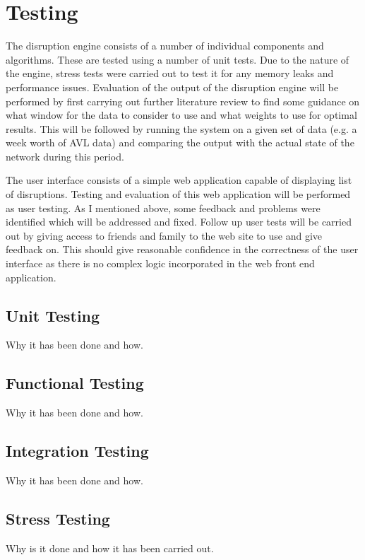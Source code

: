 \chapter{Testing}

The disruption engine consists of a number of individual components and algorithms.
These are tested using a number of unit tests. Due to the nature of
the engine, stress tests were carried out to test it for any memory leaks and
performance issues. Evaluation of the output of the disruption engine will be
performed by first carrying out further literature review to find some guidance
on what window for the data to consider to use and what weights to use for
optimal results. This will be followed by running the system on a given set
of data (e.g. a week worth of AVL data) and comparing the output with the
actual state of the network during this period.

The user interface consists of a simple web application capable of displaying
list of disruptions. Testing and evaluation of this web application will be
performed as user testing. As I mentioned above, some feedback and problems
were identified which will be addressed and fixed. Follow up user tests will be
carried out by giving access to friends and family to the web site to use and
give feedback on. This should give reasonable confidence in the correctness of
the user interface as there is no complex logic incorporated in the web front
end application.
\section{Unit Testing}
Why it has been done and how.

\section{Functional Testing}
Why it has been done and how.

\section{Integration Testing}
Why it has been done and how.

\section{Stress Testing}
Why is it done and how it has been carried out.